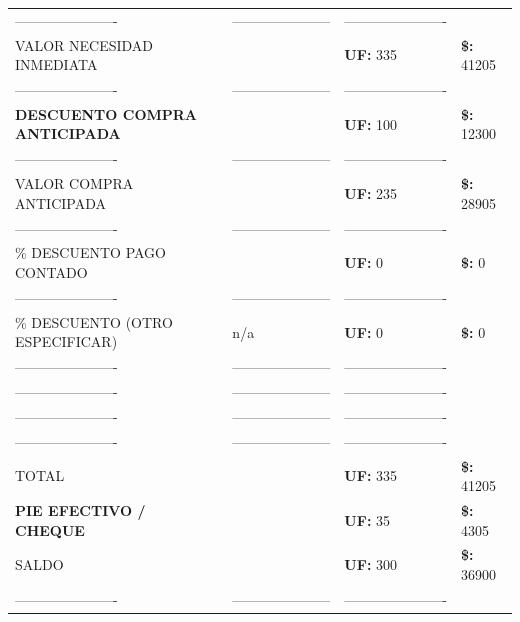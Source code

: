 \documentclass[10pt]{article}
\begin{document}
\begin{tabular}{llll}
\hline
\color{white}---------------------- & \color{white}--------------------- & \color{white}---------------------- \\
VALOR NECESIDAD INMEDIATA &  & \textbf{UF: } 335 & \textbf{\$: }41205 \\ 
\color{white}---------------------- & \color{white}--------------------- & \color{white}---------------------- \\
\textbf{DESCUENTO COMPRA ANTICIPADA} & & \textbf{UF: }100& \textbf{\$: }12300 \\ 
\color{white}---------------------- & \color{white}--------------------- & \color{white}---------------------- \\
VALOR COMPRA ANTICIPADA &  & \textbf{UF: }235& \textbf{\$: }28905 \\  
\color{white}---------------------- & \color{white}--------------------- & \color{white}---------------------- \\
\% DESCUENTO PAGO CONTADO &  & \textbf{UF: }0& \textbf{\$: }0 \\  
\color{white}---------------------- & \color{white}--------------------- & \color{white}---------------------- \\
\% DESCUENTO (OTRO ESPECIFICAR) &n/a& \textbf{UF: }0& \textbf{\$: }0 \\  
\color{white}---------------------- & \color{white}--------------------- & \color{white}---------------------- \\
\color{white}---------------------- & \color{white}--------------------- & \color{white}---------------------- \\
\color{white}---------------------- & \color{white}--------------------- & \color{white}---------------------- \\
\color{white}---------------------- & \color{white}--------------------- & \color{white}---------------------- \\
TOTAL &  & \textbf{UF: }335& \textbf{\$: }41205 \\  
\textbf{PIE EFECTIVO / CHEQUE} &  & \textbf{UF: }35& \textbf{\$: }4305 \\   
SALDO &  & \textbf{UF: }300 & \textbf{\$: } 36900 \\  
\color{white}---------------------- & \color{white}--------------------- & \color{white}---------------------- \\
\hline
\end{tabular}
\end{document}
